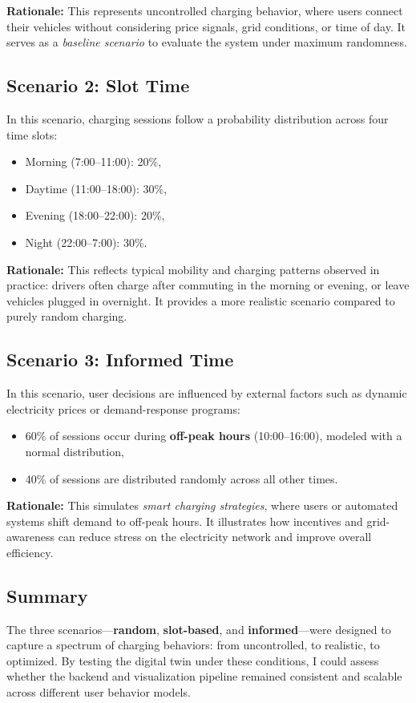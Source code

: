 \textbf{Rationale:} This represents uncontrolled charging behavior, where users connect their vehicles without considering price signals, grid conditions, or time of day.  
It serves as a \emph{baseline scenario} to evaluate the system under maximum randomness.

\subsection*{Scenario 2: Slot Time}
In this scenario, charging sessions follow a probability distribution across four time slots:
\begin{itemize}
    \item Morning (7:00–11:00): 20\%,
    \item Daytime (11:00–18:00): 30\%,
    \item Evening (18:00–22:00): 20\%,
    \item Night (22:00–7:00): 30\%.
\end{itemize}

\textbf{Rationale:} This reflects typical mobility and charging patterns observed in practice:  
drivers often charge after commuting in the morning or evening, or leave vehicles plugged in overnight.  
It provides a more realistic scenario compared to purely random charging.

\subsection*{Scenario 3: Informed Time}
In this scenario, user decisions are influenced by external factors such as dynamic electricity prices or demand-response programs:
\begin{itemize}
    \item 60\% of sessions occur during \textbf{off-peak hours} (10:00–16:00), modeled with a normal distribution,
    \item 40\% of sessions are distributed randomly across all other times.
\end{itemize}

\textbf{Rationale:} This simulates \emph{smart charging strategies}, where users or automated systems shift demand to off-peak hours.  
It illustrates how incentives and grid-awareness can reduce stress on the electricity network and improve overall efficiency.

\subsection*{Summary}
The three scenarios—\textbf{random}, \textbf{slot-based}, and \textbf{informed}—were designed to capture a spectrum of charging behaviors: from uncontrolled, to realistic, to optimized.  
By testing the digital twin under these conditions, I could assess whether the backend and visualization pipeline remained consistent and scalable across different user behavior models.

